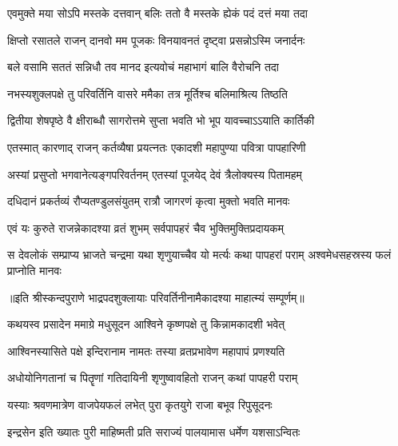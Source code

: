 \twolineshloka
{एवमुक्ते मया सोऽपि मस्तके दत्तवान् बलिः}
{ततो वै मस्तके ह्येकं पदं दत्तं मया तदा} %

\twolineshloka
{क्षिप्तो रसातले राजन् दानवो मम पूजकः}
{विनयावनतं दृष्ट्वा प्रसन्नोऽस्मि जनार्दनः} %

\twolineshloka
{बले वसामि सततं सन्निधौ तव मानद}
{इत्यवोचं महाभागं बालि वैरोचनि तदा} %

\twolineshloka
{नभस्यशुक्लपक्षे तु परिवर्तिनि वासरे}
{ममैका तत्र मूर्तिश्च बलिमाश्रित्य तिष्ठति} %

\twolineshloka
{द्वितीया शेषपृष्ठे वै क्षीराब्धौ सागरोत्तमे}
{सुप्ता भवति भो भूप यावच्चाऽऽयाति कार्तिकी} %

\twolineshloka
{एतस्मात् कारणाद् राजन् कर्तव्यैषा प्रयत्नतः}
{एकादशी महापुण्या पवित्रा पापहारिणी} %

\twolineshloka
{अस्यां प्रसुप्तो भगवानेत्यङ्गपरिवर्तनम्}
{एतस्यां पूजयेद् देवं त्रैलोक्यस्य पितामहम्} %

\twolineshloka
{दधिदानं प्रकर्तव्यं रौप्यतण्डुलसंयुतम्}
{रात्रौ जागरणं कृत्वा मुक्तो भवति मानवः} %

\twolineshloka
{एवं यः कुरुते राजन्नेकादश्या व्रतं शुभम्}
{सर्वपापहरं चैव भुक्तिमुक्तिप्रदायकम्} %

\threelineshloka
{स देवलोकं सम्प्राप्य भ्राजते चन्द्रमा यथा}
{शृणुयाच्चैव यो मर्त्यः कथा पापहरां पराम्}
{अश्वमेधसहस्रस्य फलं प्राप्नोति मानवः} %

॥इति श्रीस्कन्दपुराणे भाद्रपदशुक्लायाः परिवर्तिनीनामैकादश्या माहात्म्यं सम्पूर्णम्॥


\hyperref[sec:ekadashi_mahatmyam_vrata_raja]{\closesub}
\clearpage

\label{sec:vrata-raja-ashvina-krishnendira}


\twolineshloka
{कथयस्व प्रसादेन ममाग्रे मधुसूदन}
{आश्विने कृष्णपक्षे तु किन्नामकादशी भवेत्} %


\twolineshloka
{आश्विनस्यासिते पक्षे इन्दिरानाम नामतः}
{तस्या व्रतप्रभावेण महापापं प्रणश्यति} %

\twolineshloka
{अधोयोनिगतानां च पितॄणां गतिदायिनी}
{शृणुष्वावहितो राजन् कथां पापहरी पराम्} %

\twolineshloka
{यस्याः श्रवणमात्रेण वाजपेयफलं लभेत्}
{पुरा कृतयुगे राजा बभूव रिपुसूदनः} %

\twolineshloka
{इन्द्रसेन इति ख्यातः पुरी माहिष्मती प्रति}
{सराज्यं पालयामास धर्मेण यशसाऽन्वितः} %

